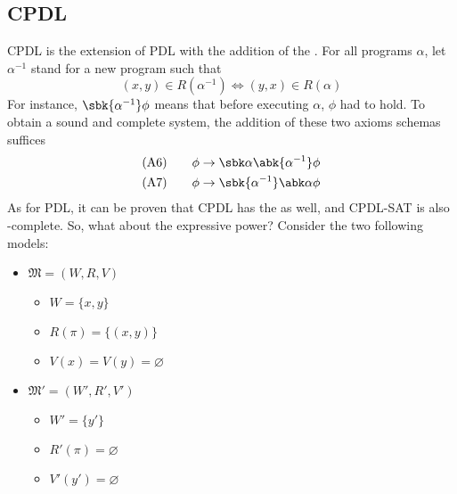\documentclass[a4paper, 12pt]{report}
\begin{document}

    \subsection{CPDL}

    CPDL is the extension of PDL with the addition of the . For all programs $\alpha$, let $\alpha^{-1}$ stand for a new program such that $$(x, y) \in R(\alpha^{-1}) \iff (y, x) \in R(\alpha)$$ For instance, $\sbk{\alpha ^{-1}}\phi$ means that before executing $\alpha$, $\phi$ had to hold. To obtain a sound and complete system, the addition of these two axioms schemas suffices
    \begin{equation*}
        \begin{alignedat}{2}
            (\mbox A 6) & \quad \quad && \phi \to \sbk \alpha \abk{\alpha^{-1}} \phi \\
            (\mbox A 7) & \quad \quad && \phi \to \sbk{\alpha ^{-1}} \abk \alpha \phi \\
        \end{alignedat}
    \end{equation*}
    As for PDL, it can be proven that CPDL has the  as well, and CPDL-SAT is also \EXP-complete. So, what about the expressive power? Consider the two following models:
    
    \begin{itemize}
        \item $\mathfrak M = (W, R, V)$
            \begin{itemize}
                \item $W = \{x, y\}$
                \item $R(\pi) = \{(x, y)\}$
                \item $V(x) = V(y) = \varnothing$
            \end{itemize}
        \item $\mathfrak M' = (W', R', V')$
            \begin{itemize}
                \item $W'= \{y'\}$
                \item $R'(\pi) = \varnothing$
                \item $V'(y') = \varnothing$
            \end{itemize}
    \end{itemize}
\end{document}
